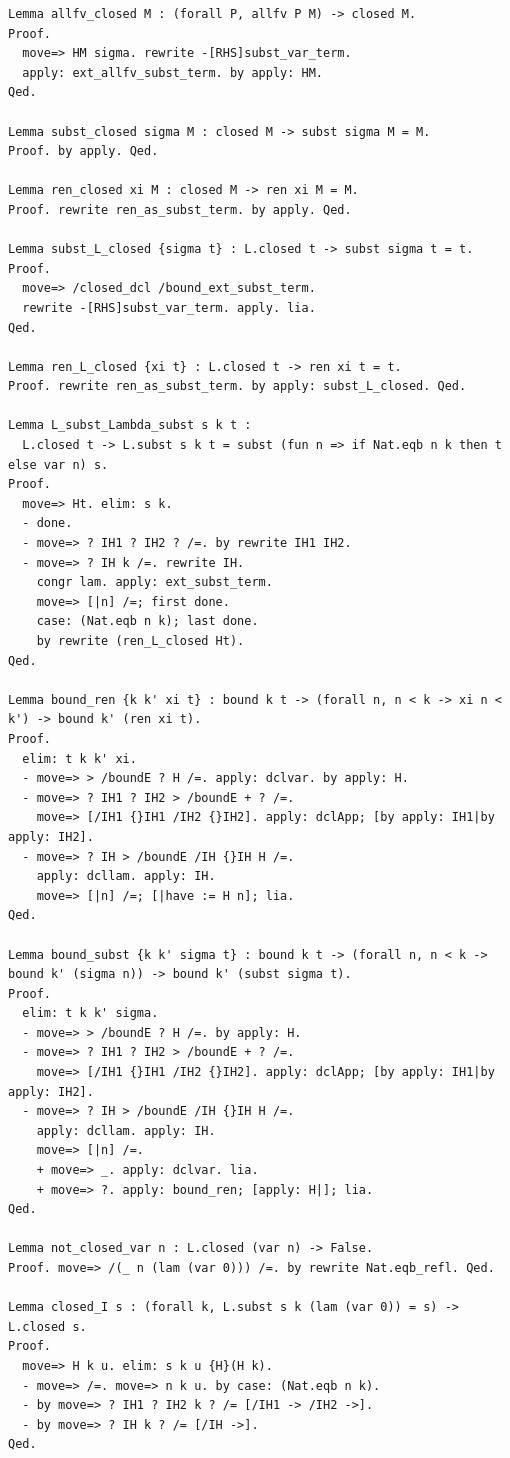 \begin{lstlisting}
Lemma allfv_closed M : (forall P, allfv P M) -> closed M.
Proof.
  move=> HM sigma. rewrite -[RHS]subst_var_term.
  apply: ext_allfv_subst_term. by apply: HM.
Qed.

Lemma subst_closed sigma M : closed M -> subst sigma M = M.
Proof. by apply. Qed.

Lemma ren_closed xi M : closed M -> ren xi M = M.
Proof. rewrite ren_as_subst_term. by apply. Qed.

Lemma subst_L_closed {sigma t} : L.closed t -> subst sigma t = t.
Proof.
  move=> /closed_dcl /bound_ext_subst_term.
  rewrite -[RHS]subst_var_term. apply. lia.
Qed.

Lemma ren_L_closed {xi t} : L.closed t -> ren xi t = t.
Proof. rewrite ren_as_subst_term. by apply: subst_L_closed. Qed.

Lemma L_subst_Lambda_subst s k t :
  L.closed t -> L.subst s k t = subst (fun n => if Nat.eqb n k then t else var n) s.
Proof.
  move=> Ht. elim: s k.
  - done. 
  - move=> ? IH1 ? IH2 ? /=. by rewrite IH1 IH2.
  - move=> ? IH k /=. rewrite IH.
    congr lam. apply: ext_subst_term.
    move=> [|n] /=; first done.
    case: (Nat.eqb n k); last done.
    by rewrite (ren_L_closed Ht).
Qed.

Lemma bound_ren {k k' xi t} : bound k t -> (forall n, n < k -> xi n < k') -> bound k' (ren xi t).
Proof.
  elim: t k k' xi.
  - move=> > /boundE ? H /=. apply: dclvar. by apply: H.
  - move=> ? IH1 ? IH2 > /boundE + ? /=.
    move=> [/IH1 {}IH1 /IH2 {}IH2]. apply: dclApp; [by apply: IH1|by apply: IH2].
  - move=> ? IH > /boundE /IH {}IH H /=.
    apply: dcllam. apply: IH.
    move=> [|n] /=; [|have := H n]; lia.
Qed.

Lemma bound_subst {k k' sigma t} : bound k t -> (forall n, n < k -> bound k' (sigma n)) -> bound k' (subst sigma t).
Proof.
  elim: t k k' sigma.
  - move=> > /boundE ? H /=. by apply: H.
  - move=> ? IH1 ? IH2 > /boundE + ? /=.
    move=> [/IH1 {}IH1 /IH2 {}IH2]. apply: dclApp; [by apply: IH1|by apply: IH2].
  - move=> ? IH > /boundE /IH {}IH H /=.
    apply: dcllam. apply: IH.
    move=> [|n] /=.
    + move=> _. apply: dclvar. lia.
    + move=> ?. apply: bound_ren; [apply: H|]; lia.
Qed.

Lemma not_closed_var n : L.closed (var n) -> False.
Proof. move=> /(_ n (lam (var 0))) /=. by rewrite Nat.eqb_refl. Qed.

Lemma closed_I s : (forall k, L.subst s k (lam (var 0)) = s) -> L.closed s.
Proof.
  move=> H k u. elim: s k u {H}(H k).
  - move=> /=. move=> n k u. by case: (Nat.eqb n k).
  - by move=> ? IH1 ? IH2 k ? /= [/IH1 -> /IH2 ->].
  - by move=> ? IH k ? /= [/IH ->].
Qed.


\end{lstlisting}
